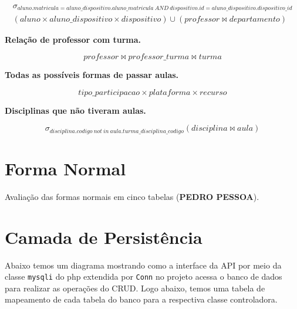 \documentclass[12pt]{article}
\begin{document}
\begin{equation}
\begin{split}
    \sigma_{aluno.matricula = aluno\_dispositivo.aluno\_matricula\ AND\ dispositivo.id = aluno\_dispositivo.dispositivo\_id} \\
    (aluno \times aluno\_dispositivo \times dispositivo) \cup (professor \bowtie departamento)
\end{split}
\end{equation}

\noindent \textbf{Relação de professor com turma.}

\begin{equation}
    professor \bowtie professor\_turma \bowtie turma
\end{equation}

\noindent \textbf{Todas as possíveis formas de passar aulas.}

\begin{equation}
    tipo\_participacao \times plataforma \times recurso
\end{equation}

\noindent \textbf{Disciplinas que não tiveram aulas.}

\begin{equation}
    \sigma_{disciplina.codigo\ not\ in\ aula.turma\_disciplina\_codigo}(disciplina \bowtie aula)
\end{equation}

\section*{Forma Normal}
Avaliação das formas normais em cinco tabelas (\textbf{PEDRO PESSOA}).

\newpage

\section*{Camada de Persistência}
Abaixo temos um diagrama mostrando como a interface da API por meio da classe \texttt{mysqli} do php extendida por \texttt{Conn} no projeto acessa o banco de dados para realizar as operações do CRUD. Logo abaixo, temos uma tabela de mapeamento de cada tabela do banco para a respectiva classe controladora.
\end{document}
